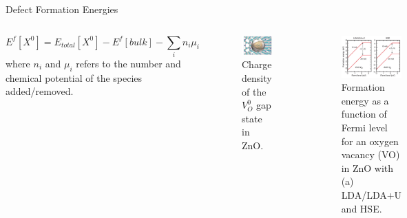 \documentclass[aspectratio=169]{beamer}
\begin{document}
    \begin{frame}{Defect Formation Energies}

        \begin{columns}
            \begin{equation*}
                E^f[X^0] = E_{total}[X^0] - E^f[bulk] - \sum_i n_i \mu_i
            \end{equation*}
            where $n_i$ and $\mu_i$ refers to the number and chemical potential of the species added/removed.

            \begin{figure}
                \centering
                \includegraphics[width=0.5\linewidth]{lectures/figures/8_Defect_Charge_Density.png}
                \caption{Charge density of the $V_O^0$ gap state in ZnO. \cite{vandewalleAdvancesElectronicStructure2011}}
            \end{figure}

            \begin{figure}
                \centering
                \includegraphics[width=0.85\linewidth]{lectures/figures/8_Defect_Diagram.png}
                \caption{Formation energy as a function of Fermi level for an oxygen vacancy (VO) in ZnO with (a) LDA/LDA+U and HSE.\cite{vandewalleAdvancesElectronicStructure2011}}
            \end{figure}

        \end{columns}

    \end{frame}
\end{document}
